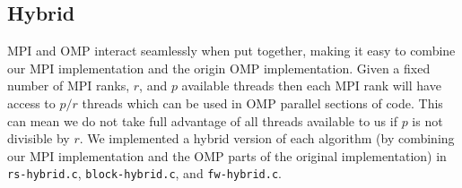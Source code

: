 \subsection{Hybrid} MPI and OMP interact seamlessly when put together, making it
easy to combine our MPI implementation and the origin OMP implementation. Given
a fixed number of MPI ranks, $r$, and $p$ available threads then each MPI rank
will have access to $p/r$ threads which can be used in OMP parallel sections of
code. This can mean we do not take full advantage of all threads available to us
if $p$ is not divisible by $r$. We implemented a hybrid version of each
algorithm (by combining our MPI implementation and the OMP parts of the original
implementation) in \texttt{rs-hybrid.c}, \texttt{block-hybrid.c}, and \texttt
{fw-hybrid.c}.
